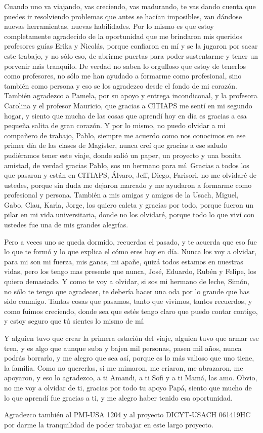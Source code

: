 \begin{agradecimiento}
{Cuando uno va viajando, vas creciendo, vas madurando, te vas dando cuenta que puedes ir resolviendo problemas que antes se hac\'ian imposibles, van d\'andose nuevas herramientas, nuevas habilidades. Por lo mismo es que estoy completamente agradecido de la oportunidad que me brindaron mis queridos profesores gu\'ias Erika y Nicol\'as, porque confiaron en m\'i y se la jugaron por sacar este trabajo, y no s\'olo eso, de abrirme puertas para poder sustentarme y tener un porvenir m\'as tranquilo. De verdad no saben lo orgulloso que estoy de tenerlos como profesores, no s\'olo me han ayudado a formarme como profesional, sino tambi\'en como persona y eso se los agradezco desde el fondo de mi coraz\'on. Tambi\'en agradezco a Pamela, por su apoyo y entrega incondiconal, y la profesora Carolina y el profesor Mauricio, que gracias a CITIAPS me sent\'i en mi segundo hogar, y siento que mucha de las cosas que aprend\'i hoy en d\'ia es gracias a esa peque\~na salita de gran coraz\'on. Y por lo mismo, no puedo olvidar a mi compa\~nero de trabajo, Pablo, siempre me acuerdo como nos conocimos en ese primer d\'ia de las clases de Mag\'ister, nunca cre\'i que gracias a ese saludo pudi\'eramos tener este viaje, donde sali\'o un paper, un proyecto y una bonita amistad, de verdad gracias Pablo, sos un hermano para m\'i. Gracias a todos los que pasaron y est\'an en CITIAPS, \'Alvaro, Jeff, Diego, Farisori, no me olvidar\'e de ustedes, porque sin duda me dejaron marcado y me ayudaron a formarme como profesional y persona. Tambi\'en a mis amigas y amigos de la Usach, Miguel, Gabo, Clau, Karla, Jorge, los quiero caleta y gracias por todo, porque fueron un pilar en mi vida universitaria, donde no los olvidar\'e, porque todo lo que viv\'i con ustedes fue una de mis grandes alegr\'ias.

Pero a veces uno se queda dormido, recuerdas el pasado, y te acuerda que eso fue lo que te form\'o y lo que explica el c\'omo eres hoy en d\'ia. Nunca los voy a olvidar, para mi son mi fuerza, mis ganas, mi apa\~ne, quiz\'a todos estamos en nuestras vidas, pero los tengo mas presente que nunca, Jos\'e, Eduardo, Rub\'en y Felipe, los quiero demasiado. Y como te voy a olvidar, si sos mi hermano de leche, Sim\'on, no s\'olo te tengo que agradecer, te deber\'ia hacer una oda por lo grande que has sido conmigo. Tantas cosas que pasamos, tanto que vivimos, tantos recuerdos, y como fuimos creciendo, donde sea que est\'es tengo claro que puedo contar contigo, y estoy seguro que t\'u sientes lo mismo de m\'i.

Y alguien tuvo que crear la primera estaci\'on del viaje, alguien tuvo que armar ese tren, y es algo que aunque suba y bajen mil personas, pasen mil a\~nos, nunca podr\'as borrarlo, y me alegro que sea as\'i, porque es lo m\'as valioso que uno tiene, la familia. Como no quererlas, si me mimaron, me criaron, me abrazaron, me apoyaron, y eso lo agradezco, a ti Amandi, a ti Sofi y a ti Mam\'a, las amo. Obvio, no me voy a olvidar de ti, gracias por todo tu apoyo Pap\'a, siento que mucho de lo que aprend\'i fue gracias a ti, y me alegro haber tenido esa oportunidad.

Agradezco tambi\'en al PMI-USA 1204 y al proyecto DICYT-USACH 061419HC por darme la tranquilidad de poder trabajar en este largo proyecto.}
\end{agradecimiento}